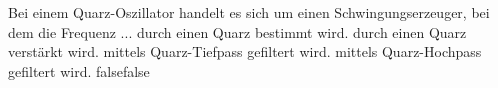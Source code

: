     {Bei einem Quarz-Oszillator handelt es sich um einen Schwingungserzeuger, bei dem die Frequenz ...}
    {durch einen Quarz bestimmt wird.}
    {durch einen Quarz verstärkt wird.}
    {mittels Quarz-Tiefpass gefiltert wird.}
    {mittels Quarz-Hochpass gefiltert wird.}
    {false}{false}